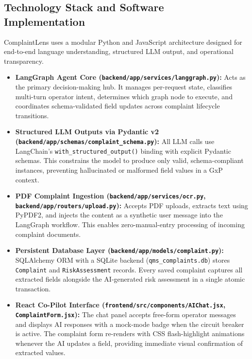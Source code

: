 \documentclass[12pt,a4paper]{report}
\begin{document}
\subsection{Technology Stack and Software Implementation}

ComplaintLens uses a modular Python and JavaScript architecture designed for end-to-end language understanding, structured LLM output, and operational transparency.

\begin{itemize}[leftmargin=*]
\item \textbf{LangGraph Agent Core (\texttt{backend/\allowbreak app/\allowbreak services/\allowbreak langgraph.py}):} Acts as the primary decision-making hub. It manages per-request state, classifies multi-turn operator intent, determines which graph node to execute, and coordinates schema-validated field updates across complaint lifecycle transitions.

\item \textbf{Structured LLM Outputs via Pydantic v2 (\texttt{backend/\allowbreak app/\allowbreak schemas/\allowbreak complaint\_schema.py}):} All LLM calls use LangChain's \texttt{with\_structured\_output()} binding with explicit Pydantic schemas. This constrains the model to produce only valid, schema-compliant instances, preventing hallucinated or malformed field values in a GxP context.

\item \textbf{PDF Complaint Ingestion (\texttt{backend/\allowbreak app/\allowbreak services/\allowbreak ocr.py}, \texttt{backend/\allowbreak app/\allowbreak routers/\allowbreak upload.py}):} Accepts PDF uploads, extracts text using PyPDF2, and injects the content as a synthetic user message into the LangGraph workflow. This enables zero-manual-entry processing of incoming complaint documents.

\item \textbf{Persistent Database Layer (\texttt{backend/\allowbreak app/\allowbreak models/\allowbreak complaint.py}):} SQLAlchemy ORM with a SQLite backend (\texttt{qms\_complaints.db}) stores \texttt{Complaint} and \texttt{RiskAssessment} records. Every saved complaint captures all extracted fields alongside the AI-generated risk assessment in a single atomic transaction.

\item \textbf{React Co-Pilot Interface (\texttt{frontend/\allowbreak src/\allowbreak components/\allowbreak AIChat.jsx}, \texttt{ComplaintForm.jsx}):} The chat panel accepts free-form operator messages and displays AI responses with a mock-mode badge when the circuit breaker is active. The complaint form re-renders with CSS flash-highlight animations whenever the AI updates a field, providing immediate visual confirmation of extracted values.
\end{itemize}
\end{document}
